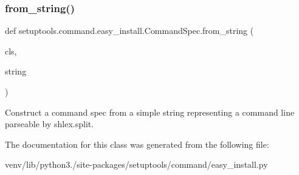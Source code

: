 \subsubsection{\texorpdfstring{from\+\_\+string()}{from\_string()}}
{\footnotesize\ttfamily def setuptools.\+command.\+easy\+\_\+install.\+Command\+Spec.\+from\+\_\+string (\begin{DoxyParamCaption}\item[{}]{cls,  }\item[{}]{string }\end{DoxyParamCaption})}

\begin{DoxyVerb}Construct a command spec from a simple string representing a command
line parseable by shlex.split.
\end{DoxyVerb}
 

The documentation for this class was generated from the following file\+:\begin{DoxyCompactItemize}
\item 
venv/lib/python3./site-\/packages/setuptools/command/easy\+\_\+install.\+py\end{DoxyCompactItemize}
